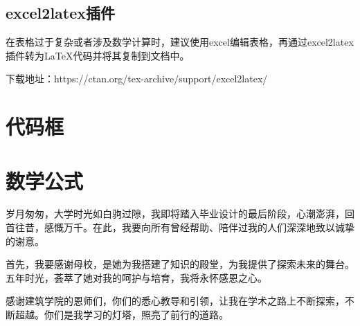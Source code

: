 \documentclass[AutoFakeBold]{ZafuThesis}
\begin{document}
\subsection{excel2latex插件}
在表格过于复杂或者涉及数学计算时，建议使用excel编辑表格，再通过excel2latex插件转为\LaTeX 代码并将其复制到文档中。
\par
下载地址：https://ctan.org/tex-archive/support/excel2latex/

\section{代码框}

\section{数学公式}




\clearpage
% 
% 

% 

\Thanks
{
  岁月匆匆，大学时光如白驹过隙，我即将踏入毕业设计的最后阶段，心潮澎湃，回首往昔，感慨万千。在此，我要向所有曾经帮助、陪伴过我的人们深深地致以诚挚的谢意。\par
  首先，我要感谢母校，是她为我搭建了知识的殿堂，为我提供了探索未来的舞台。五年时光，荟萃了她对我的呵护与培育，我将永怀感恩之心。\par
  感谢建筑学院的恩师们，你们的悉心教导和引领，让我在学术之路上不断探索，不断超越。你们是我学习的灯塔，照亮了前行的道路。
}
\end{document}
